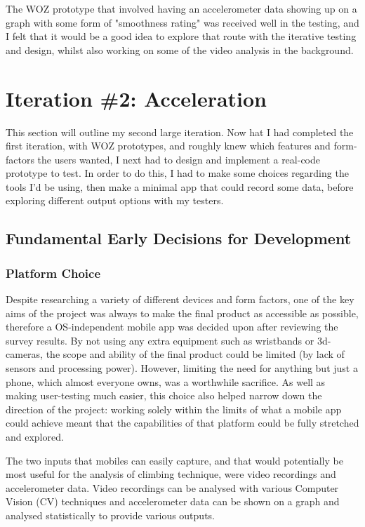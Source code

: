 The WOZ prototype that involved having an accelerometer data showing up on a graph with some form of "smoothness rating" was received well in the testing, and I felt that it would be a good idea to explore that route with the iterative testing and design, whilst also working on some of the video analysis in the background.


\section{Iteration \#2: Acceleration}
This section will outline my second large iteration.
Now hat I had completed the first iteration, with WOZ prototypes, and roughly knew which features and form-factors the users wanted, I next had to design and implement a real-code prototype to test.
In order to do this, I had to make some choices regarding the tools I'd be using, then make a minimal app that could record some data, before exploring different output options with my testers.


\subsection{Fundamental Early Decisions for Development}


\subsubsection{Platform Choice}
Despite researching a variety of different devices and form factors, one of the key aims of the project was always to make the final product as accessible as possible, therefore a OS-independent mobile app was decided upon after reviewing the survey results.
By not using any extra equipment such as wristbands or 3d-cameras, the scope and ability of the final product could be limited (by lack of sensors and processing power).
However, limiting the need for anything but just a phone, which almost everyone owns, was a worthwhile sacrifice.
As well as making user-testing much easier, this choice also helped narrow down the direction of the project: working solely within the limits of what a mobile app could achieve meant that the capabilities of that platform could be fully stretched and explored.

The two inputs that mobiles can easily capture, and that would potentially be most useful for the analysis of climbing technique, were video recordings and accelerometer data.
Video recordings can be analysed with various Computer Vision (CV) techniques and accelerometer data can be shown on a graph and analysed statistically to provide various outputs.

